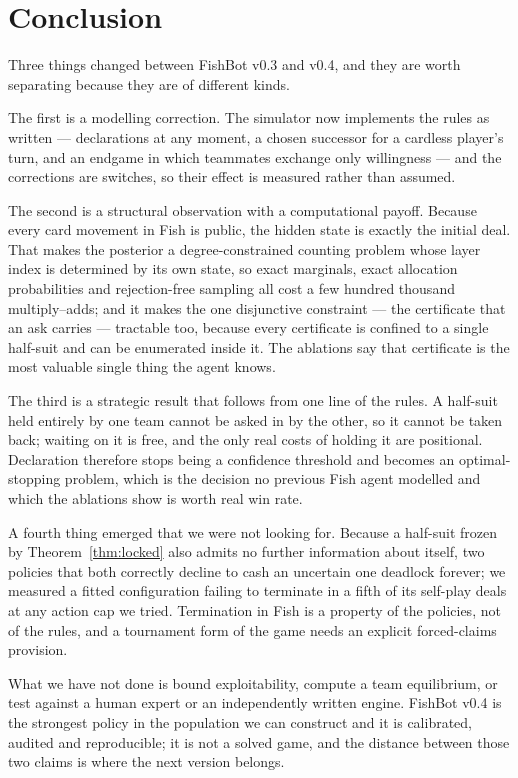 \section{Conclusion}

Three things changed between FishBot v0.3 and v0.4, and they are worth separating
because they are of different kinds.

The first is a modelling correction. The simulator now implements the rules as
written --- declarations at any moment, a chosen successor for a cardless
player's turn, and an endgame in which teammates exchange only willingness ---
and the corrections are switches, so their effect is measured rather than
assumed.

The second is a structural observation with a computational payoff. Because every
card movement in Fish is public, the hidden state is exactly the initial deal.
That makes the posterior a degree-constrained counting problem whose layer index
is determined by its own state, so exact marginals, exact allocation
probabilities and rejection-free sampling all cost a few hundred thousand
multiply--adds; and it makes the one disjunctive constraint --- the certificate
that an ask carries --- tractable too, because every certificate is confined to a
single half-suit and can be enumerated inside it. The ablations say that
certificate is the most valuable single thing the agent knows.

The third is a strategic result that follows from one line of the rules. A
half-suit held entirely by one team cannot be asked in by the other, so it cannot
be taken back; waiting on it is free, and the only real costs of holding it are
positional. Declaration therefore stops being a confidence threshold and becomes
an optimal-stopping problem, which is the decision no previous Fish agent
modelled and which the ablations show is worth real win rate.

A fourth thing emerged that we were not looking for. Because a half-suit frozen
by Theorem~\ref{thm:locked} also admits no further information about itself, two
policies that both correctly decline to cash an uncertain one deadlock forever;
we measured a fitted configuration failing to terminate in a fifth of its
self-play deals at any action cap we tried. Termination in Fish is a property of
the policies, not of the rules, and a tournament form of the game needs an
explicit forced-claims provision.

What we have not done is bound exploitability, compute a team equilibrium, or
test against a human expert or an independently written engine. FishBot v0.4 is
the strongest policy in the population we can construct and it is calibrated,
audited and reproducible; it is not a solved game, and the distance between those
two claims is where the next version belongs.
